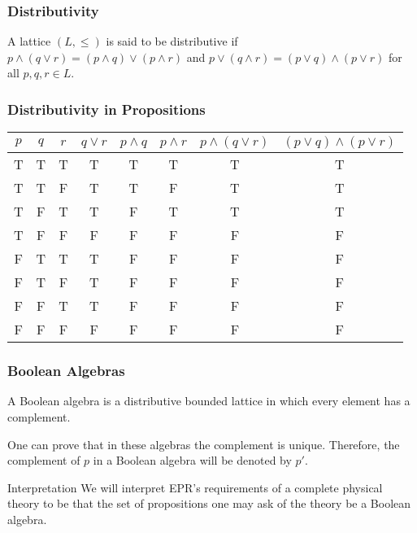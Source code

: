\documentclass{beamer}
\begin{document}
\begin{frame}

	\frametitle{Distributivity}

	\begin{definition}
	
		A lattice $(L,\leq)$ is said to be distributive if $p\wedge(q\vee r)=(p\wedge q)\vee(p\wedge r)$ and $p\vee (q\wedge r)=(p\vee q)\wedge (p\vee r)$ for all $p,q,r\in L$.	
	
	\end{definition}

\end{frame}

\begin{frame}

	\frametitle{Distributivity in Propositions}

	\center
	\begin{tabular}{|c|c|c|c|c|c|c|c|}
	\hline
	$p$ & $q$ & $r$ & $q\vee r$ & $p\wedge q$ & $p\wedge r$ & $p\wedge(q\vee r)$ & $(p\vee q)\wedge(p\vee r)$ \\
	\hline
	T & T & T & T & T & T & T & T \\
	T & T & F & T & T & F & T & T \\
	T & F & T & T & F & T & T & T \\
	T & F & F & F & F & F & F & F \\
	F & T & T & T & F & F & F & F \\
	F & T & F & T & F & F & F & F \\
	F & F & T & T & F & F & F & F \\
	F & F & F & F & F & F & F & F \\
	\hline
	\end{tabular}

\end{frame}

\begin{frame}

	\frametitle{Boolean Algebras}
	
	\begin{definition}
	
		A Boolean algebra is a distributive bounded lattice in which every element has a complement.	
	
	\end{definition}

	One can prove that in these algebras the complement is unique. Therefore, the complement of $p$ in a Boolean algebra will be denoted by $p'$.

	\begin{alertblock}{Interpretation}
		We will interpret EPR's requirements of a complete physical theory to be that the set of propositions one may ask of the theory be a Boolean algebra.
	\end{alertblock}

\end{frame}
\end{document}
